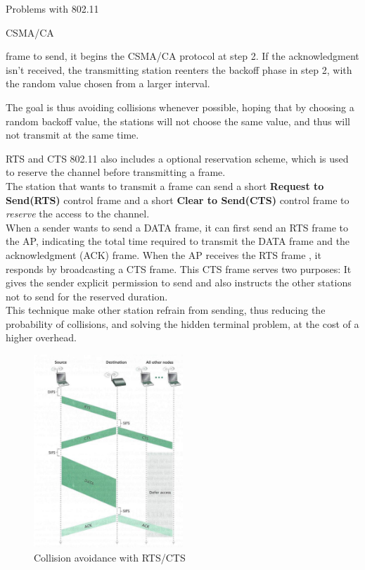 \begin{section}{Problems with 802.11}
\begin{subsection}{CSMA/CA}
\begin{enumerate}
        frame to send, it begins the CSMA/CA protocol at step 2. If the acknowledgment isn't 
        received, the transmitting station reenters the backoff phase in step 2, with the random 
        value chosen from a larger interval.
    \end{enumerate}
    The goal is thus avoiding collisions whenever possible, hoping that by choosing a random
    backoff value, the stations will not choose the same value, and thus will not transmit at the
    same time.\\
    \begin{subsubsection}{RTS and CTS}
      802.11 also includes a optional reservation scheme, which is used to reserve the channel before
      transmitting a frame.\\
      The station that wants to transmit a frame can send a short \textbf{Request to Send(RTS)} 
      control frame and a short \textbf{Clear to Send(CTS)} control frame to \textit{reserve} the
      access to the channel.\\
      When a sender wants to send a DATA frame, it can first send an RTS frame to the AP, indicating 
      the total time required to transmit the DATA frame and the acknowledgment (ACK) frame. When 
      the AP receives the RTS frame , it responds by broadcasting a CTS frame. This CTS frame serves 
      two purposes: It gives the sender explicit permission to send and also instructs the other 
      stations not to send for the reserved duration.\\
      This technique make other station refrain from sending, thus reducing the probability of
      collisions, and solving the hidden terminal problem, at the cost of a higher overhead.\\
      \begin{figure}[h]
        \centering
        \includegraphics[width=0.5\textwidth]{img/wireless/cmsa with RTS.png}
        \caption{Collision avoidance with RTS/CTS}
      \end{figure}

    \end{subsubsection}

  \end{subsection}
\end{section}
